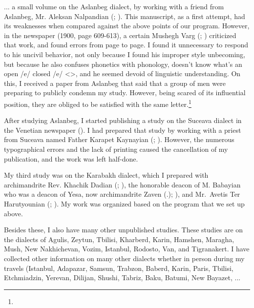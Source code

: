 ... a small volume on the Aslanbeg dialect, by working with a friend from Aslanbeg, Mr. Aleksan Nalpandian (; ). This manuscript, as a first attempt, had its weaknesses when compared against the above points of our program. However, in the  newspaper (1900, page 609-613), a certain Mushegh Varg (; )  criticized that work, and found errors from page to page. I found it unnecessary to respond to his uncivil behavior, not only because I found his improper style unbecoming, but because he also  confuses phonetics with phonology, doesn't know what's an open /e/  closed /e/ <>, and he seemed devoid of linguistic understanding. On this, I received a paper from Aslanbeg that said that a group of men were preparing to publicly condemn my study. However, being scared of its influential position, they are obliged to be satisfied with the same letter.\footnote{} 

After studying Aslanbeg, I started publishing a study on the Suceava dialect in the Venetian newspaper  (). I had prepared that study by working with a priest from Suceava named Father Karapet Kaynayian (; ). However, the numerous typographical errors and the lack of printing caused the cancellation of my publication, and the work was left half-done.

My third study was on the Karabakh dialect, which I prepared with archimandrite Rev. Khachik Dadian (; ), the honorable deacon of M. Babayian who was a deacon of Yesa, now archimandrite Zaven (.); ), and Mr.~Avetis Ter Harutyounian (; ). My work was organized based on the program that we set up above. 

Besides these, I also have many other unpublished studies. These studies are on the dialects of Agulis, Zeytun, Tbilisi, Kharberd, Karin, Hamshen, Maragha, Mush, New Nakhichevan, Vozim, Istanbul, Rodosto, Van, and Tigranakert. I have collected other information on many other dialects whether in person during my travels (Istanbul, Adapazar, Samsun, Trabzon, Baberd, Karin, Paris, Tbilisi, Etchmiadzin, Yerevan, Dilijan, Shushi, Tabriz, Baku, Batumi, New Bayazet, ... 


